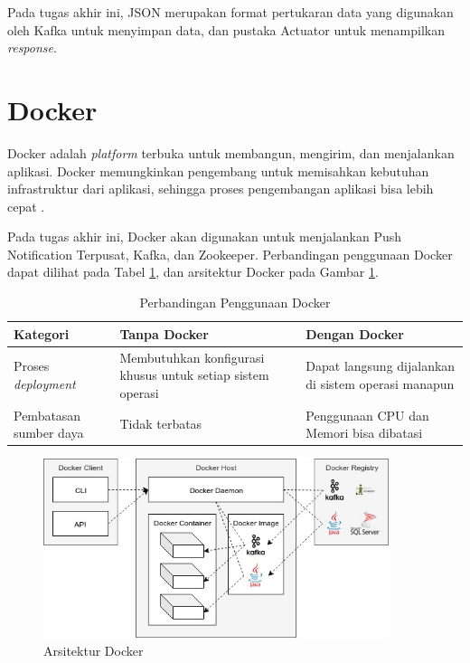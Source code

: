 \par Pada tugas akhir ini, JSON merupakan format pertukaran data yang digunakan oleh Kafka untuk menyimpan data, dan pustaka Actuator untuk menampilkan \textit{response}.

\section{Docker}
\par Docker adalah \textit{platform} terbuka untuk membangun, mengirim, dan menjalankan aplikasi. Docker memungkinkan pengembang untuk memisahkan kebutuhan infrastruktur dari aplikasi, sehingga proses pengembangan aplikasi bisa lebih cepat \cite{docker-online}.
\par Pada tugas akhir ini, Docker akan digunakan untuk menjalankan Push Notification Terpusat, Kafka, dan Zookeeper. Perbandingan penggunaan Docker dapat dilihat pada Tabel \ref{t:perbandingan_docker}, dan arsitektur Docker pada Gambar \ref{img:arsitektur-docker}.
\begin{longtable}{|p{2.5cm}|p{3.5cm}|p{3.5cm}|}
	\caption{Perbandingan Penggunaan Docker} \label{t:perbandingan_docker} \\ \hline
	\rowcolor{lightgray} Kategori & Tanpa Docker & Dengan Docker \\ \hline
	\endhead
	Proses \textit{deployment} & Membutuhkan konfigurasi khusus untuk setiap sistem operasi & Dapat langsung dijalankan di sistem operasi manapun \\ \hline
	Pembatasan sumber daya & Tidak terbatas & Penggunaan CPU dan Memori bisa dibatasi \\ \hline
\end{longtable}
\begin{figure}[H]
\centering\includegraphics[width=0.9\textwidth]{bab2/img/arsitektur-docker.jpg}
\caption{Arsitektur Docker}
\label{img:arsitektur-docker}
\end{figure}

